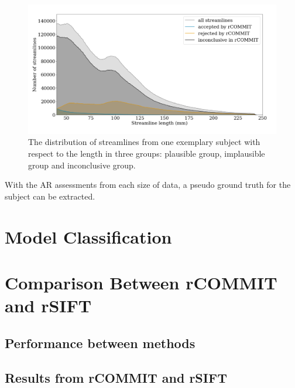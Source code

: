 \begin{figure}[ht]
    \centering
    \includegraphics[width= 15cm]{figures/three_groups_hist.png}
        \caption{The distribution of streamlines from one exemplary subject with respect to the length in three groups: plausible group, implausible group and inconclusive group. }
    \label{fig:threegroup}
\end{figure}


With the AR assessments from each size of data, a pseudo ground truth for the subject can be extracted.


\section{Model Classification}

\section{Comparison Between rCOMMIT and rSIFT}

\subsection{Performance between methods}

\subsection{Results from rCOMMIT and rSIFT}


